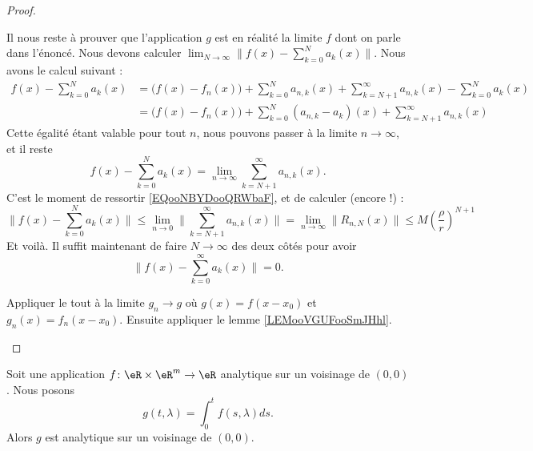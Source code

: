\begin{proof}
\begin{subproof}
		\spitem[\( f=g\)]
		Il nous reste à prouver que l'application \( g\) est en réalité la limite \( f\) dont on parle dans l'énoncé. Nous devons calculer \( \lim_{N\to\infty}\| f(x)-\sum_{k=0}^Na_k(x) \|\). Nous avons le calcul suivant :
		\begin{subequations}
			\begin{align}
				f(x)-\sum_{k=0}^Na_k(x) & =\big( f(x)-f_n(x) \big)+\sum_{k=0}^Na_{n,k}(x)+\sum_{k=N+1}^{\infty}a_{n,k}(x)-\sum_{k=0}^Na_k(x) \\
				                        & =\big( f(x)-f_n(x) \big)+\sum_{k=0}^N(a_{n,k}-a_k)(x)+\sum_{k=N+1}^{\infty}a_{n,k}(x)
			\end{align}
		\end{subequations}
		Cette égalité étant valable pour tout \( n\), nous pouvons passer à la limite \( n\to \infty\), et il reste
		\begin{equation}
			f(x)-\sum_{k=0}^{N}a_k(x)=\lim_{n\to \infty}\sum_{k=N+1}^{\infty}a_{n,k}(x).
		\end{equation}
		C'est le moment de ressortir \eqref{EQooNBYDooQRWbaF}, et de calculer (encore !) :
		\begin{equation}
			\| f(x)-\sum_{k=0}^Na_k(x) \|\leq \lim_{n\to 0}\| \sum_{k=N+1}^{\infty}a_{n,k}(x) \|=\lim_{n\to \infty}\| R_{n,N}(x) \|\leq M\left( \frac{ \rho }{ r } \right)^{N+1}
		\end{equation}
		Et voilà. Il suffit maintenant de faire \( N\to \infty\) des deux côtés pour avoir
		\begin{equation}
			\| f(x)-\sum_{k=0}^{\infty}a_k(x) \|=0.
		\end{equation}

		\spitem[Si \( x_0\neq 0\)]
		Appliquer le tout à la limite \( g_n\to g\) où \( g(x)=f(x-x_0)\) et \( g_n(x)=f_n(x-x_0)\). Ensuite appliquer le lemme \ref{LEMooVGUFooSmJHhl}.
	\end{subproof}
\end{proof}

\begin{lemma}	\label{LEMooRRUMooRqDwYr}
	Soit une application \(f \colon \eR\times \eR^m\to \eR  \) analytique sur un voisinage de \( (0,0)\). Nous posons
	\begin{equation}
		g(t,\lambda)=\int_{0}^tf(s,\lambda)ds.
	\end{equation}
	Alors \( g\) est analytique sur un voisinage de \( (0,0)\).
\end{lemma}

